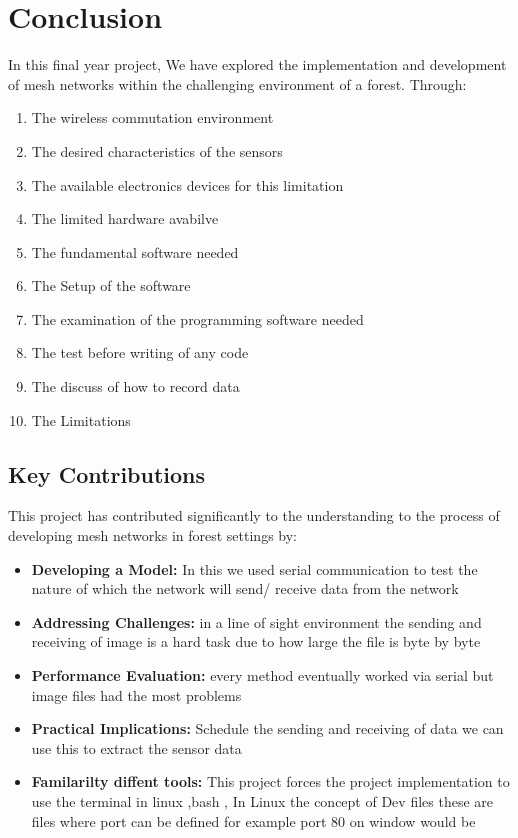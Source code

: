 \section{Conclusion}
\label{ch:conclusion} %

In this final year project, We have explored the implementation and development of mesh networks within the challenging environment of a forest. Through:
\begin{enumerate}
    \item The wireless commutation environment 
    \item The desired characteristics of the sensors
    \item The available electronics devices for this limitation
    \item The limited hardware avabilve
    \item The  fundamental software needed
    \item The Setup of the software
    \item The examination of the programming software needed
    \item The test before writing of any code 
    \item The discuss of how to record data
    \item The Limitations
\end{enumerate}
\subsection{Key Contributions}

This project has contributed significantly to the understanding to the process of developing mesh networks in forest settings by:

\begin{itemize}
    \item \textbf{Developing a Model:} In this we used serial communication to test the nature of  which the network will send/ receive data from the network 
    \item \textbf{Addressing Challenges:} in a line of sight environment the sending and receiving of image is a hard task due to  how large the file is byte by byte
    \item \textbf{Performance Evaluation:} every method eventually worked via serial but image files had the  most problems
    \item \textbf{Practical Implications:} Schedule the sending  and  receiving  of data we can use this to extract the sensor data
    \item \textbf{Familarilty  diffent tools:} This project forces the project implementation to use the terminal in linux ,bash , In Linux the concept of Dev files these are files where port can be defined for example port 80 on window would be 
\end{itemize}
